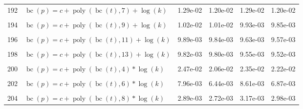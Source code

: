 \documentclass[12pt,a4paper]{article}
\DeclareMathOperator{\bc}{bc}
\DeclareMathOperator{\poly}{poly}
\begin{document}
\begin{longtable}[t]{ll>{\raggedleft\arraybackslash}p{2cm}>{\raggedleft\arraybackslash}p{2cm}>{\raggedleft\arraybackslash}p{2cm}>{\raggedleft\arraybackslash}p{2cm}}
192 & $\bc(p) = c + \poly\left( \bc(t), 7 \right) + \log(k)$ & 1.29e-02 & 1.20e-02 & 1.29e-02 & 1.20e-02\\
\cellcolor{gray!6}{193} & \cellcolor{gray!6}{$\bc(p) = c + \poly\left( \bc(t), 8 \right) + \log(k)$} & \cellcolor{gray!6}{1.02e-02} & \cellcolor{gray!6}{1.01e-02} & \cellcolor{gray!6}{9.96e-03} & \cellcolor{gray!6}{9.87e-03}\\
194 & $\bc(p) = c + \poly\left( \bc(t), 9 \right) + \log(k)$ & 1.02e-02 & 1.01e-02 & 9.93e-03 & 9.85e-03\\
\cellcolor{gray!6}{195} & \cellcolor{gray!6}{$\bc(p) = c + \poly\left( \bc(t), 10 \right) + \log(k)$} & \cellcolor{gray!6}{9.91e-03} & \cellcolor{gray!6}{9.88e-03} & \cellcolor{gray!6}{9.62e-03} & \cellcolor{gray!6}{9.59e-03}\\
196 & $\bc(p) = c + \poly\left( \bc(t), 11 \right) + \log(k)$ & 9.89e-03 & 9.84e-03 & 9.63e-03 & 9.57e-03\\
\cellcolor{gray!6}{197} & \cellcolor{gray!6}{$\bc(p) = c + \poly\left( \bc(t), 12 \right) + \log(k)$} & \cellcolor{gray!6}{9.82e-03} & \cellcolor{gray!6}{9.80e-03} & \cellcolor{gray!6}{9.55e-03} & \cellcolor{gray!6}{9.52e-03}\\
198 & $\bc(p) = c + \poly\left( \bc(t), 13 \right) + \log(k)$ & 9.82e-03 & 9.80e-03 & 9.55e-03 & 9.52e-03\\
\cellcolor{gray!6}{199} & \cellcolor{gray!6}{$\bc(p) = c + \poly\left( \bc(t), 3 \right) * \log(k)$} & \cellcolor{gray!6}{3.63e-02} & \cellcolor{gray!6}{1.78e-02} & \cellcolor{gray!6}{2.01e-02} & \cellcolor{gray!6}{1.90e-02}\\
200 & $\bc(p) = c + \poly\left( \bc(t), 4 \right) * \log(k)$ & 2.47e-02 & 2.06e-02 & 2.35e-02 & 2.22e-02\\
\cellcolor{gray!6}{201} & \cellcolor{gray!6}{$\bc(p) = c + \poly\left( \bc(t), 5 \right) * \log(k)$} & \cellcolor{gray!6}{9.27e-03} & \cellcolor{gray!6}{8.83e-03} & \cellcolor{gray!6}{8.79e-03} & \cellcolor{gray!6}{8.78e-03}\\
202 & $\bc(p) = c + \poly\left( \bc(t), 6 \right) * \log(k)$ & 7.96e-03 & 6.44e-03 & 8.61e-03 & 6.87e-03\\
\cellcolor{gray!6}{203} & \cellcolor{gray!6}{$\bc(p) = c + \poly\left( \bc(t), 7 \right) * \log(k)$} & \cellcolor{gray!6}{5.85e-03} & \cellcolor{gray!6}{4.96e-03} & \cellcolor{gray!6}{6.01e-03} & \cellcolor{gray!6}{5.22e-03}\\
204 & $\bc(p) = c + \poly\left( \bc(t), 8 \right) * \log(k)$ & 2.89e-03 & 2.72e-03 & 3.17e-03 & 2.98e-03\\

\end{longtable}
\end{document}
